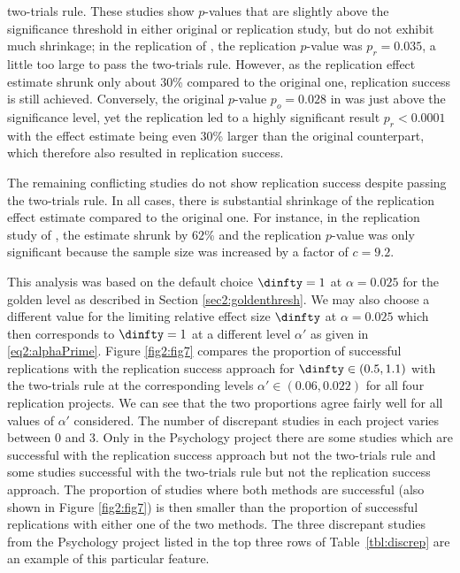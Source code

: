 two-trials rule. These studies show $p$-values that are slightly above the
significance threshold in either original or replication study, but do not
exhibit much shrinkage; in the replication of \citet{Oberauer2008}, the
replication $p$-value was $p_r = 0.035$, a little too large to pass the
two-trials rule. However, as the replication effect estimate shrunk only about
$30$\% compared to the original one, replication success is still achieved.
Conversely, the original $p$-value $p_o = 0.028$ in \citet{Schmidt2008} was just
above the significance level, yet the replication led to a highly significant
result $p_r < 0.0001$ with the effect estimate being even $30$\% larger than the
original counterpart, which therefore also resulted in replication success.

The remaining conflicting studies do not show replication success despite
passing the two-trials rule. In all cases, there is substantial shrinkage of the
replication effect estimate compared to the original one. For instance, in the
replication study of \citet{Pyc2010}, the estimate shrunk by $62$\% and the
replication $p$-value was only significant because the sample size was increased
by a factor of $c = 9.2$.



This analysis was based on the default choice $\dinfty=1$ at $\alpha=0.025$ for
the golden level as described in Section \ref{sec2:goldenthresh}. We may also
choose a different value for the limiting relative effect size $\dinfty$ at
$\alpha=0.025$ which then corresponds to $\dinfty=1$ at a different level
$\alpha'$ as given in \eqref{eq2:alphaPrime}. Figure \ref{fig2:fig7} compares the
proportion of successful replications with the replication success approach for
$\dinfty \in (0.5, 1.1)$ with the two-trials rule at the
corresponding levels
$\alpha' \in (0.06, 0.022)$ for
all four replication projects. We can see that the two proportions agree fairly
well for all values of $\alpha'$ considered. The number of discrepant studies in
each project varies between 0 and 3. Only in the Psychology project there are
some studies which are successful with the replication success approach but not
the two-trials rule and some studies successful with the two-trials rule but not
the replication success approach. The proportion of studies where both methods
are successful (also shown in Figure \ref{fig2:fig7}) is then smaller than the
proportion of successful replications with either one of the two methods. The
three discrepant studies from the Psychology project listed in the top three
rows of Table~\ref{tbl:discrep} are an example of this particular feature.

